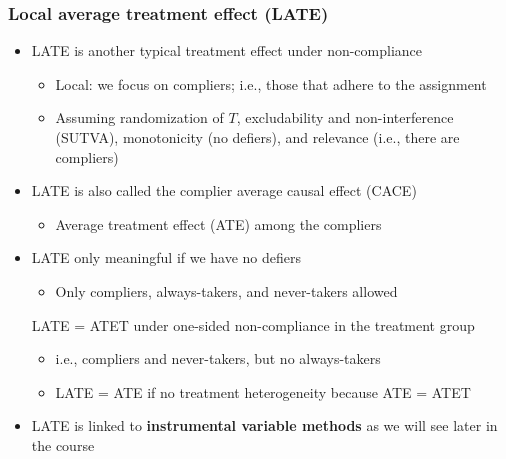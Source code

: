 \documentclass[10pt]{article}
\begin{document}
\subsubsection{Local average treatment effect (LATE)}
\begin{itemize}
    \item LATE is another typical treatment effect under non-compliance 
    \begin{itemize}
        \item Local: we focus on compliers; i.e., those that adhere to the assignment 
        \item Assuming randomization of $T $, excludability and non-interference (SUTVA), monotonicity (no defiers), and relevance (i.e., there are compliers)
    \end{itemize}
    \item LATE is also called the complier average causal effect (CACE)
    \begin{itemize}
        \item Average treatment effect (ATE) among the compliers 
    \end{itemize}
    \item LATE only meaningful if we have no defiers 
    \begin{itemize}
        \item Only compliers, always-takers, and never-takers allowed
    \end{itemize}
    LATE = ATET under one-sided non-compliance in the treatment group 
    \begin{itemize}
        \item i.e., compliers and never-takers, but no always-takers 
        \item LATE = ATE if no treatment heterogeneity because ATE = ATET 
    \end{itemize}
    \item LATE is linked to \textbf{instrumental variable methods} as we will see later in the course 
\end{itemize}
\end{document}
